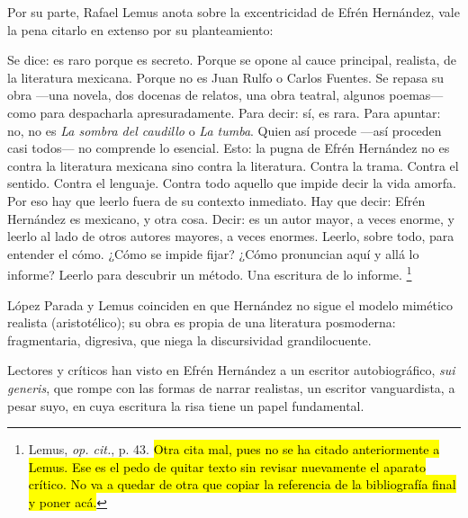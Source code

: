 \documentclass[14pt,twoside,final]{extbook} %
\let\oldfootnote\footnote
\renewcommand\footnote[1]{%
\oldfootnote{\hspace{1mm}#1}}
\begin{document}
Por su parte, Rafael Lemus anota sobre la excentricidad de Efrén Hernández, vale la pena citarlo en extenso por su planteamiento:
\begin{quoting}
Se dice: es raro porque es secreto. Porque se opone al cauce principal, realista, de la literatura mexicana. Porque no es Juan Rulfo o Carlos Fuentes. Se repasa su obra ---una novela, dos docenas de relatos, una obra teatral, algunos poemas--- como para despacharla apresuradamente. Para decir: sí, es rara. Para apuntar: no, no es \emph{La sombra del caudillo} o \emph{La tumba}. Quien así procede ---así proceden casi todos--- no comprende lo esencial. Esto: la pugna de Efrén Hernández no es contra la literatura mexicana sino contra la literatura. Contra la trama. Contra el sentido. Contra el lenguaje. Contra todo aquello que impide decir la vida amorfa. Por eso hay que leerlo fuera de su contexto inmediato. Hay que decir: Efrén Hernández es mexicano, y otra cosa. Decir: es un autor mayor, a veces enorme, y leerlo al lado de otros autores mayores, a veces enormes. Leerlo, sobre todo, para entender el cómo. ¿Cómo se impide fijar? ¿Cómo pronuncian aquí y allá lo informe? Leerlo para descubrir un método. Una escritura de lo informe.\footnote{Lemus, \emph{op. cit.}, p. 43. \hl{Otra cita mal, pues no se ha citado anteriormente a Lemus. Ese es el pedo de quitar texto sin revisar nuevamente el aparato crítico. No va a quedar de otra que copiar la referencia de la bibliografía final y poner acá.}}
\end{quoting}
López Parada y Lemus coinciden en que Hernández no sigue el modelo mimético realista (aristotélico); su obra es propia de una literatura posmoderna: fragmentaria, digresiva, que niega la discursividad grandilocuente.

Lectores y críticos han visto en Efrén Hernández a un escritor autobiográfico, \emph{sui generis}, que rompe con las formas de narrar realistas, un escritor vanguardista, a pesar suyo, en cuya escritura la risa tiene un papel fundamental.
\end{document}
